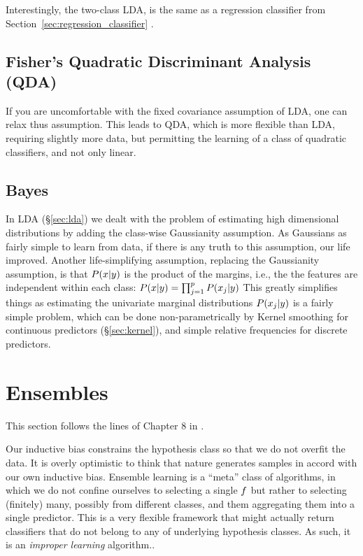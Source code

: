 \begin{remark}
Interestingly, the two-class LDA, is the same as a regression classifier from  Section~\ref{sec:regression_classifier} \cite[Eq. 4.11 ]{hastie_elements_2003}.
\end{remark}



\subsection{Fisher's Quadratic Discriminant Analysis (QDA)}
\label{sec:qda}
If you are uncomfortable with the fixed covariance assumption of LDA, one can relax thus assumption.
This leads to QDA, which is more flexible than LDA, requiring slightly more data, but permitting the learning of a class of quadratic classifiers, and not only linear.






\subsection{\Naive Bayes}
\label{sec:naive_bayes}

In LDA (\S\ref{sec:lda}) we dealt with the problem of estimating high dimensional distributions by adding the class-wise Gaussianity assumption. As Gaussians as fairly simple to learn from data, if there is any truth to this assumption, our life improved. 
Another life-simplifying assumption, replacing the Gaussianity assumption, is that $P(x|y)$ is the product of the margins, i.e., the the features are independent within each class: $P(x|y)=\prod_{j=1}^pP(x_j|y)$
This greatly simplifies things as estimating the univariate marginal distributions $P(x_j|y)$ is a fairly simple problem, which can be done non-parametrically by Kernel smoothing for continuous predictors (\S\ref{sec:kernel}), and simple relative frequencies for discrete predictors. 




\section{Ensembles}
\label{sec:ensembles}

This section follows the lines of Chapter 8 in \cite{hastie_elements_2003}.

Our inductive bias constrains the hypothesis class so that we do not overfit the data. 
It is overly optimistic to think that nature generates samples in accord with our own inductive bias.
Ensemble learning is a ``meta'' class of algorithms, in which we do not confine ourselves to selecting a single $f$ but rather to selecting (finitely) many, possibly from different classes, and them aggregating them into a single predictor.
This is a very flexible framework that might actually return classifiers that do not belong to any of underlying hypothesis classes. As such, it is an \emph{improper learning} algorithm..

